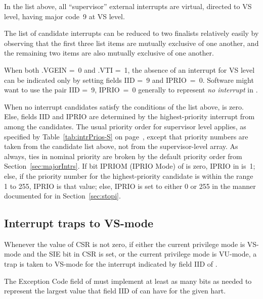 In the list above, all ``supervisor'' external interrupts are virtual,
directed to VS level, having major code~9 at VS level.

\begin{commentary}
The list of candidate interrupts can be reduced to two finalists
relatively easily by observing that the first three list items are
mutually exclusive of one another, and the remaining two items are also
mutually exclusive of one another.
\end{commentary}

\begin{commentary}
When both .VGEIN =~0 and .VTI =~1, the
absence of an interrupt for VS level can be indicated only by setting
 fields IID =~9 and IPRIO~=~0.
Software might want to use the pair IID =~9, IPRIO~=~0 generally to
represent\/ \emph{no interrupt} in .
\end{commentary}

When no interrupt candidates satisfy the conditions of the list above,
 is zero.
Else,  fields IID and IPRIO are determined by the
highest-priority interrupt from among the candidates.
The usual priority order for supervisor level applies, as specified by
Table~\ref{tab:intrPrios-S} on page~\pageref{tab:intrPrios-S}, except
that priority numbers are taken from the candidate list above, not from
the supervisor-level  array.
As always, ties in nominal priority are broken by the default priority
order from Section~\ref{sec:majorIntrs}.
If bit IPRIOM (IPRIO Mode) of  is zero,
IPRIO in  is~1;
else, if the priority number for the highest-priority candidate is within the
range 1 to 255, IPRIO is that value;
else, IPRIO is set to either 0 or 255 in the manner documented
for  in Section~\ref{sec:stopi}.

\subsection{Interrupt traps to \mbox{VS-mode}}

Whenever the value of CSR  is not zero, if either the current
privilege mode is \mbox{VS-mode} and the SIE bit in CSR 
is set, or the current privilege mode is \mbox{VU-mode}, a trap is
taken to \mbox{VS-mode} for the interrupt indicated by field IID of
.

The Exception Code field of  must implement at least as
many bits as needed to represent the largest value that field IID of
 can have for the given hart.

